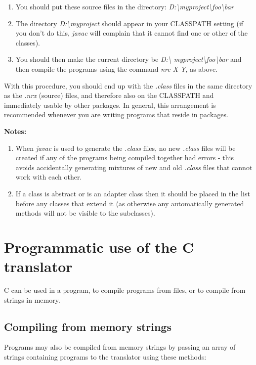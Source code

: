 \begin{enumerate}
\item
You should put these source files in the directory:
\emph{D:\textbackslash myproject\textbackslash foo\textbackslash bar}
\item
The directory \emph{D:\textbackslash myproject} should appear in your CLASSPATH
setting (if you don't do this, \emph{javac} will complain that it cannot
find one or other of the classes).
\item
You should then make the current directory be \emph{D:\textbackslash
myproject\textbackslash foo\textbackslash bar}
and then compile the programs using the command \emph{nrc X Y},
as above.
\end{enumerate}

With this procedure, you should end up with the \emph{.class} files in
the same directory as the \emph{.nrx} (source) files, and therefore also
on the CLASSPATH and immediately usable by other packages.  In general,
this arrangement is recommended whenever you are writing programs that
reside in packages.

\textbf{Notes:}
\begin{enumerate}
\item
When \emph{javac} is used to generate the \emph{.class} files, no
new \emph{.class} files will be created if any of the programs being
compiled together had errors - this avoids accidentally generating
mixtures of new and old \emph{.class} files that cannot work with each
other.
\item
If a class is abstract or is an adapter class then it should be placed
in the list before any classes that extend it (as otherwise any
automatically generated methods will not be visible to the subclasses).
\end{enumerate}

\chapter{Programmatic use of the \nr{}C translator}
\nr{}C can be used in a program, to compile \nr{} programs from files,
or to compile from strings in memory. 

\section{Compiling from memory strings}
Programs may also be compiled from memory strings by passing an array
of strings containing programs to the translator using these methods:

